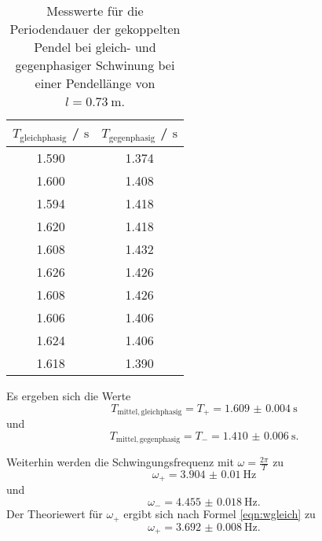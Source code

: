 
\begin{table}
	\centering
	\caption{Messwerte für die Periodendauer der gekoppelten Pendel bei gleich- und
	gegenphasiger Schwinung bei einer Pendellänge von $l=\SI{0.73}{\meter}$.}
	\label{tab:beckham}
	\begin{tabular}{cc}
		\toprule
		$T_{\mathrm{gleichphasig}}$ / $\si{\second}$ & $T_{\mathrm{gegenphasig}}$ 
		/ $\si{\second}$ \\
		\midrule
		1.590 & 1.374 \\
		1.600 & 1.408 \\
		1.594 & 1.418 \\
		1.620 & 1.418 \\
		1.608 & 1.432 \\
		1.626 & 1.426 \\
		1.608 & 1.426 \\
		1.606 & 1.406 \\
		1.624 & 1.406 \\
		1.618 & 1.390 \\
		\bottomrule
	\end{tabular}
\end{table}

Es ergeben sich die Werte 
\begin{equation*}
	T_{\mathrm{mittel,gleichphasig}} = T_+ = \SI{1.609(4)}{\second}
\end{equation*}
und
\begin{equation*}
	T_{\mathrm{mittel,gegenphasig}} = T_- = \SI{1.410(6)}{\second} \mathrm{.}
\end{equation*}

Weiterhin werden die Schwingungsfrequenz mit $\omega = \frac{2\pi}{T}$ zu
\begin{equation*}
	\omega_+ = \SI{3.904(10)}{\hertz}
\end{equation*}
und
\begin{equation*}
	\omega_- = \SI{4.455(18)}{\hertz} \mathrm{.}
\end{equation*}
Der Theoriewert für $\omega_+$ ergibt sich nach Formel \eqref{eqn:wgleich} zu
\begin{equation*}
	\omega_+ = \SI{3.692(8)}{\hertz} \mathrm{.}
\end{equation*}


